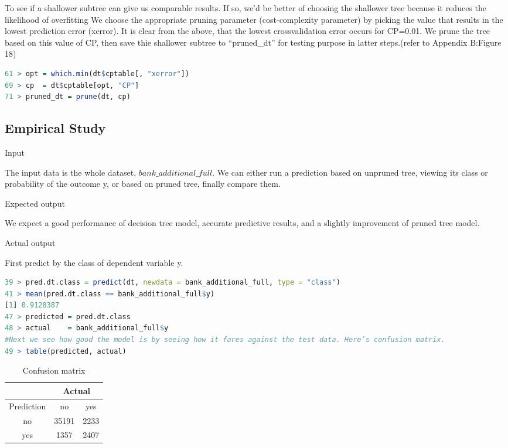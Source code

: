 \documentclass[12pt, a4paper, bibliography=totoc, english]{scrartcl}
\begin{document}
To see if a shallower subtree can give us comparable results. If so, we’d be better of choosing the shallower tree because it reduces the likelihood of overfitting We choose the appropriate pruning parameter (cost-complexity parameter) by picking the value that results in the lowest prediction error (xerror). It is clear from the above, that the lowest cross\-validation error occurs for CP=0.01. We prune the tree based on this value of CP, then save thie shallower subtree to “pruned\_dt” for testing purpose in latter steps.(refer to Appendix B:Figure 18)

\begin{lstlisting}[language = R]
61 > opt = which.min(dt$cptable[, "xerror"])
69 > cp  = dt$cptable[opt, "CP"]
71 > pruned_dt = prune(dt, cp)
\end{lstlisting}


\subsection{Empirical Study}

\textbullet\quad Input

The input data is the whole dataset, $bank\_additional\_full$. We can either run a prediction based on unpruned tree, viewing its class or probability of the outcome y, or based on pruned tree, finally compare them. 

\textbullet\quad Expected output 

We expect a good performance of decision tree model, accurate predictive results, and a slightly improvement of pruned tree model.

\textbullet\quad Actual output 

First predict by the class of dependent variable y.

\begin{lstlisting}[language = R]
39 > pred.dt.class = predict(dt, newdata = bank_additional_full, type = "class") 
41 > mean(pred.dt.class == bank_additional_full$y) 
[1] 0.9128387
47 > predicted = pred.dt.class
48 > actual    = bank_additional_full$y
#Next we see how good the model is by seeing how it fares against the test data. Here’s confusion matrix.
49 > table(predicted, actual)
\end{lstlisting}



\begin{table}[!hbp]
	\centering
	\begin{tabular}{|c|c|c|}
		\hline
		&\multicolumn{2}{|c|}{Actual} \\
		\hline
		Prediction & no & yes  \\
		\hline
		no & 35191 & 2233 \\
		\hline
		yes & 1357 & 2407 \\
		\hline
	\end{tabular}
	\caption{Confusion matrix} 
\end{table}
\end{document}
